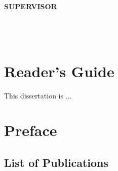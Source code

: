 





	\usepackage[table]{xcolor} %




\usepackage{pdfpages}
\usepackage{gensymb}
\usepackage{amsmath}


\usepackage{ifthen}


	
	
	
    \frontmatter 

    
    
  
    \cleardoublepage
\textbf{{\large SUPERVISOR}}\\
\vspace*{0.8cm}\\
\Large{\textbf{}}\\
\vspace*{0.8cm}
\normalsize{}\\



    
    

    
    
     \thispagestyle{empty}
     \chapter*{Reader's Guide}
 
This dissertation is ...


\chapter*{Preface}
\label{sec:preface}

\section*{List of Publications}
\label{sec:publications}
